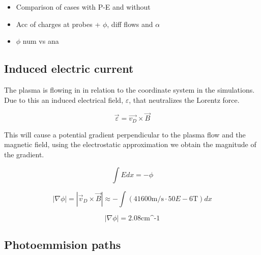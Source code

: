 \begin{itemize}
	\item Comparison of cases with P-E and without
	\item Acc of charges at probes + $\phi$, diff flows and $\alpha$
	\item $\phi$ num vs ana
\end{itemize}

\subsection{Induced electric current}
	The plasma is flowing in in relation to the coordinate system in the simulations.
	Due to this an induced electrical field, \(\varepsilon\), that neutralizes the Lorentz force.

	\begin{equation}
		\vec{\varepsilon} = \vec{v_D}\times \vec{B}
	\end{equation}

	This will cause a potential gradient perpendicular to the plasma flow and the magnetic field,
	using the electrostatic approximation we obtain the magnitude of the gradient.


	\begin{equation}
		\int{Edx} = -\phi
	\end{equation}

	\begin{equation}
		|\nabla\phi| = |\vec{v}_D\times\vec{B}| \approx -\int \left( 41600 \text{m/s}\cdot 50E-6 \text{T} \right) dx
	\end{equation}

	\begin{equation}
		|\nabla\phi| = 2.08 \text{cm^{-1}}
	\end{equation}


\subsection{Photoemmision paths}


